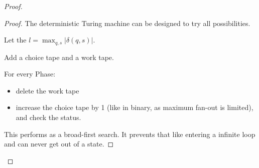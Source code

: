 \begin{proof}
\begin{proof}
The deterministic Turing machine can be designed to try all
possibilities.

Let the \(l = \max_{q,s}|\delta(q,s)|\).

Add a choice tape and a work tape.

For every Phase:

\begin{itemize}
\item
  delete the work tape
\item
  increase the choice tape by 1 (like in binary, as maximum fan-out is
  limited), and check the status.
\end{itemize}

This performs as a broad-first search. It prevents that like entering a
infinite loop and can never get out of a state.
\end{proof}

\end{proof}